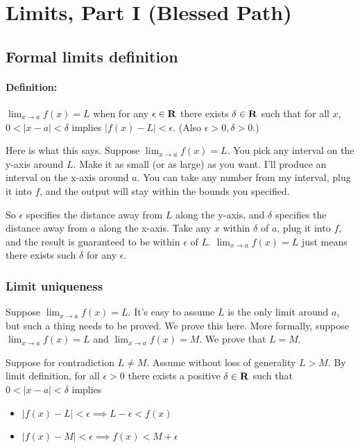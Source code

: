 \section{Limits, Part I (Blessed Path)}

\subsection{Formal limits definition}

\paragraph{Definition:} $\lim_{x\to a}f(x)=L$ when for any
$\epsilon\in\mathbf{R}$ there exists $\delta\in\mathbf{R}$ such that for all $x$,
$0<|x-a|<\delta$ implies $|f(x)-L|<\epsilon$. (Also $\epsilon>0, \delta>0$.)

\vs

Here is what this says. Suppose $\lim_{x\to a}f(x)=L$. You pick any
interval on the y-axis around $L$. Make it as small (or as large) as
you want. I'll produce an interval on the x-axis around $a$. You can
take any number from my interval, plug it into $f$, and the output
will stay within the bounds you specified.

\vs

So $\epsilon$ specifies the distance away from $L$ along the y-axis, and
$\delta$ specifies the distance away from $a$ along the x-axis. Take any
$x$ within $\delta$ of $a$, plug it into $f$, and the result is guaranteed
to be within $\epsilon$ of $L$. $\lim_{x\to a}f(x)=L$ just means there exists
such $\delta$ for any $\epsilon$.

\subsubsection*{Limit uniqueness}

Suppose $\lim_{x\to a}f(x)=L$. It's easy to assume $L$ is the only limit
around $a$, but such a thing needs to be proved. We prove this here.
More formally, suppose $\lim_{x\to a}f(x)=L$ and
$\lim_{x\to a}f(x)=M$. We prove that $L=M$.

\vs

Suppose for contradiction $L\neq M$. Assume without loss of generality
$L>M$. By limit definition, for all $\epsilon>0$ there exists a positive
$\delta\in\mathbf{R}$ such that $0<|x-a|<\delta$ implies

\begin{itemize}
\item $|f(x)-L|<\epsilon\implies L-\epsilon<f(x)$
\item $|f(x)-M|<\epsilon\implies f(x)<M+\epsilon$
\end{itemize}
    
